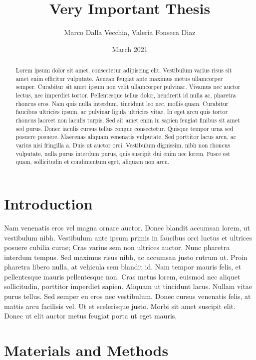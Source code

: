 \documentclass[12pt, letterpaper]{article}
\title{Very Important Thesis}
\author{Marco Dalla Vecchia, Valeria Fonseca Diaz}
\date{March 2021}
\begin{document}
\maketitle

\begin{abstract}
Lorem ipsum dolor sit amet, consectetur adipiscing elit. Vestibulum varius risus sit amet enim efficitur vulputate. Aenean feugiat ante maximus metus ullamcorper semper. Curabitur sit amet ipsum non velit ullamcorper pulvinar. Vivamus nec auctor lectus, nec imperdiet tortor. Pellentesque tellus dolor, hendrerit id nulla ac, pharetra rhoncus eros. Nam quis nulla interdum, tincidunt leo nec, mollis quam. Curabitur faucibus ultricies ipsum, ac pulvinar ligula ultricies vitae. In eget arcu quis tortor rhoncus laoreet non iaculis turpis. Sed sit amet enim in sapien feugiat finibus sit amet sed purus. Donec iaculis cursus tellus congue consectetur. Quisque tempor urna sed posuere posuere. Maecenas aliquam venenatis vulputate. Sed porttitor lacus arcu, ac varius nisi fringilla a. Duis ut auctor orci. Vestibulum dignissim, nibh non rhoncus vulputate, nulla purus interdum purus, quis suscipit dui enim nec lorem. Fusce est quam, sollicitudin et condimentum eget, aliquam non arcu.
\end{abstract}

\section{Introduction}

\newline
Nam venenatis eros vel magna ornare auctor. Donec blandit accumsan lorem, ut vestibulum nibh. Vestibulum ante ipsum primis in faucibus orci luctus et ultrices posuere cubilia curae; Cras varius sem non ultrices auctor. Nunc pharetra interdum tempus. Sed maximus risus nibh, ac accumsan justo rutrum ut. Proin pharetra libero nulla, at vehicula sem blandit id. Nam tempor mauris felis, et pellentesque mauris pellentesque non. Cras metus lorem, euismod nec aliquet sollicitudin, porttitor imperdiet sapien. Aliquam ut tincidunt lacus. Nullam vitae purus tellus. Sed semper eu eros nec vestibulum. Donec cursus venenatis felis, at mattis arcu facilisis vel. Ut et scelerisque justo. Morbi sit amet suscipit elit. Donec ut elit auctor metus feugiat porta ut eget mauris.


\section{Materials and Methods}
\end{document}
